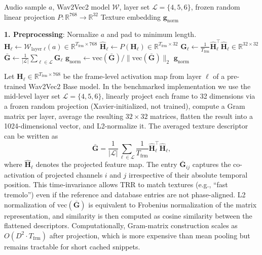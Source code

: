 \begin{algorithm}[ht]
		\caption{Benchmarked Texture Resonance Retrieval (TRR) Encoding}
		\label{alg:trr_encoding}
		\begin{algorithmic}
			\REQUIRE Audio sample $a$, Wav2Vec2 model $\mathcal{W}$, layer set $\mathcal{L}=\{4,5,6\}$, frozen random linear projection $P:\mathbb{R}^{768}\rightarrow\mathbb{R}^{32}$
			\ENSURE Texture embedding $\mathbf{g}_{\text{norm}}$

			\STATE \textbf{1. Preprocessing}: Normalize $a$ and pad to minimum length.
			\STATE $\mathbf{H}_{\ell} \leftarrow \mathcal{W}_{\text{layer }\ell}(a) \in \mathbb{R}^{T_{\text{frm}} \times 768}$
			\STATE $\widehat{\mathbf{H}}_{\ell} \leftarrow P(\mathbf{H}_{\ell}) \in \mathbb{R}^{T_{\text{frm}} \times 32}$
			\STATE $\mathbf{G}_{\ell} \leftarrow \frac{1}{T_{\text{frm}}}\widehat{\mathbf{H}}_{\ell}^{\top}\widehat{\mathbf{H}}_{\ell} \in \mathbb{R}^{32 \times 32}$
			\ENDFOR
			\STATE $\bar{\mathbf{G}} \leftarrow \frac{1}{|\mathcal{L}|}\sum_{\ell\in\mathcal{L}}\mathbf{G}_{\ell}$
			\STATE $\mathbf{g}_{\text{norm}} \leftarrow \mathrm{vec}(\bar{\mathbf{G}}) / \|\mathrm{vec}(\bar{\mathbf{G}})\|_2$
		\RETURN $\mathbf{g}_{\text{norm}}$
	\end{algorithmic}
\end{algorithm}

Let $\mathbf{H}_{\ell} \in \mathbb{R}^{T_{\text{frm}} \times 768}$ be the frame-level activation map from layer $\ell$ of a pre-trained Wav2Vec2 Base model. In the benchmarked implementation we use the mid-level layer set $\mathcal{L}=\{4,5,6\}$, linearly project each frame to 32 dimensions via a frozen random projection (Xavier-initialized, not trained), compute a Gram matrix per layer, average the resulting $32\times 32$ matrices, flatten the result into a 1024-dimensional vector, and L2-normalize it. The averaged texture descriptor can be written as
\begin{equation}
		\bar{\mathbf{G}} = \frac{1}{|\mathcal{L}|}\sum_{\ell\in\mathcal{L}} \frac{1}{T_{\text{frm}}}\widehat{\mathbf{H}}_{\ell}^{\top}\widehat{\mathbf{H}}_{\ell},
\end{equation}
where $\widehat{\mathbf{H}}_{\ell}$ denotes the projected feature map. The entry $\bar{\mathbf{G}}_{ij}$ captures the co-activation of projected channels $i$ and $j$ irrespective of their absolute temporal position. This time-invariance allows TRR to match textures (e.g., ``fast tremolo'') even if the reference and database entries are not phase-aligned. L2 normalization of $\mathrm{vec}(\bar{\mathbf{G}})$ is equivalent to Frobenius normalization of the matrix representation, and similarity is then computed as cosine similarity between the flattened descriptors. Computationally, Gram-matrix construction scales as $O(D^2 \cdot T_{\text{frm}})$ after projection, which is more expensive than mean pooling but remains tractable for short cached snippets.

